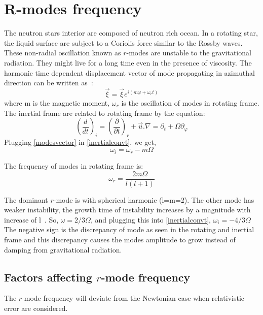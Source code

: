 \documentclass{ttuthes2007}
\begin{document}
\section{R-modes frequency}
The neutron stars interior are composed of neutron rich ocean. In a rotating
star, the liquid surface are subject to a Coriolis force similar to the Rossby
waves. These non-radial oscillation known as $r$-modes are unstable to the
gravitational radiation. They might live for a long time even in the presence of
viscosity.
The harmonic time dependent displacement vector of mode propagating in azimuthal
direction can be written as~\cite{ANDERSSON_2001}:
\begin{equation}\label{modesvector}
\vec{\xi}= \vec{\xi} e^{i(m\varphi+\omega_r t)}
\end{equation}
where m is the magnetic moment, $\omega_r$ is the oscillation of modes in
rotating frame.
The inertial frame are related to rotating frame by the equation:
\begin{equation}\label{inertialconvt}
\left(\frac{d}{dt}\right)_i=\left(\frac{\partial}{\partial t}\right)_r+\vec{u}.\nabla=\partial_t+ \Omega
\partial_\varphi
\end{equation}
Plugging \ref{modesvector} in \ref{inertialconvt}, we get,
\begin{equation}
\omega_i=\omega_r - m\Omega
\end{equation}

The frequency of modes in rotating frame is:
\begin{equation}\label{rotatingframe}
\omega_r = \frac{2m\Omega}{l(l+1)}
\end{equation}

The dominant $r$-mode is with spherical harmonic (l=m=2). The other mode has
weaker instability, the growth time of instability increases by a magnitude
with increase of l~\cite{ANDERSSON_2001}.
So, $\omega=2/3\Omega$, and plugging this into \ref{inertialconvt},
$\omega_i = -4/3\Omega$
The negative sign is the discrepancy of mode as seen in the rotating and
inertial frame and this discrepancy causes the modes amplitude to grow instead
of damping from gravitational radiation. 

\subsection{Factors affecting $r$-mode frequency}
The $r$-mode frequency will deviate from the Newtonian case when relativistic
error are considered. 
\end{document}

